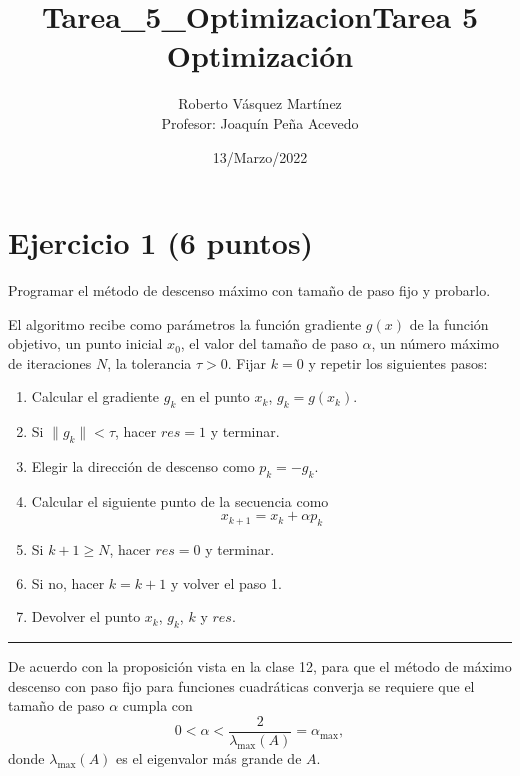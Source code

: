 \documentclass[11pt]{article}
\title{Tarea\_5\_Optimizacion}
\providecommand{\tightlist}{%
      \setlength{\itemsep}{0pt}\setlength{\parskip}{0pt}}
\begin{document}
    
    \title{Tarea 5 Optimización}
    \author{Roberto Vásquez Martínez \\ Profesor: Joaquín Peña Acevedo}
    \date{13/Marzo/2022}
    \maketitle   
    
    

    
    \hypertarget{ejercicio-1-6-puntos}{%
\section{Ejercicio 1 (6 puntos)}\label{ejercicio-1-6-puntos}}

Programar el método de descenso máximo con tamaño de paso fijo y
probarlo.

El algoritmo recibe como parámetros la función gradiente \(g(x)\) de la
función objetivo, un punto inicial \(x_0\), el valor del tamaño de paso
\(\alpha\), un número máximo de iteraciones \(N\), la tolerancia
\(\tau>0\). Fijar \(k=0\) y repetir los siguientes pasos:

\begin{enumerate}
\def\labelenumi{\arabic{enumi}.}
\tightlist
\item
  Calcular el gradiente \(g_k\) en el punto \(x_k\), \(g_k = g(x_k)\).
\item
  Si \(\|g_k\| < \tau\), hacer \(res=1\) y terminar.
\item
  Elegir la dirección de descenso como \(p_k = - g_k\).
\item
  Calcular el siguiente punto de la secuencia como
  \[x_{k+1} = x_k + \alpha p_k \]
\item
  Si \(k+1\geq N\), hacer \(res=0\) y terminar.
\item
  Si no, hacer \(k = k+1\) y volver el paso 1.
\item
  Devolver el punto \(x_k\), \(g_k\), \(k\) y \(res\).
\end{enumerate}

\begin{center}\rule{0.5\linewidth}{0.5pt}\end{center}

De acuerdo con la proposición vista en la clase 12, para que el método
de máximo descenso con paso fijo para funciones cuadráticas converja se
requiere que el tamaño de paso \(\alpha\) cumpla con
\[ 0 < \alpha < \frac{2}{\lambda_{\max}(A)} = \alpha_{\max}, \] donde
\(\lambda_{\max}(A)\) es el eigenvalor más grande de \(A\).
\end{document}
